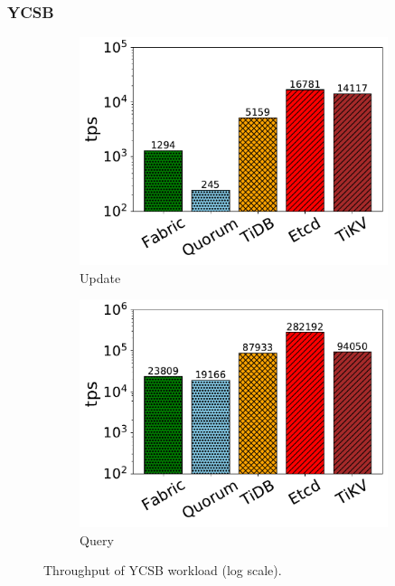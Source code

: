 \subsubsection{YCSB}

\begin{figure}[tp]
	\centering
    \begin{subfigure}{0.45\textwidth}
        \includegraphics[width=0.99\textwidth]{chart/twin/ycsb-update.pdf}
        \caption{Update}
    \end{subfigure}
    \begin{subfigure}{0.45\textwidth}
        \includegraphics[width=0.99\textwidth]{chart/twin/ycsb-query.pdf}        
        \caption{Query}
    \end{subfigure}
    \caption{Throughput of YCSB workload (log scale).}
    \label{chart:twin:ycsb-thruput}
\end{figure}

